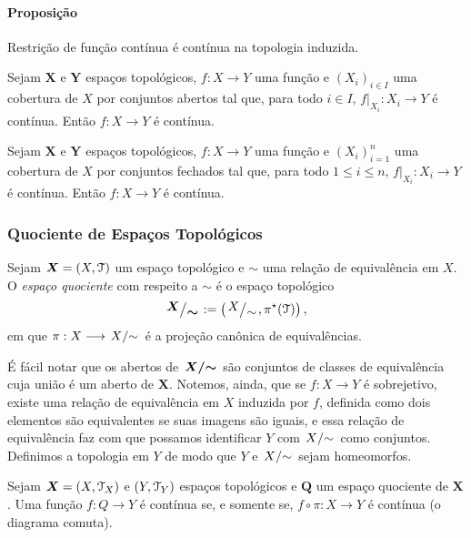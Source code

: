 \paragraph*{Proposição} Restrição de função contínua é contínua na topologia induzida.

\begin{prop}
Sejam $\bm X$ e $\bm Y$ espaços topológicos, $f: X \to Y$ uma função e $(X_i)_{i \in I}$ uma cobertura de $X$ por conjuntos abertos tal que, para todo $i \in I$, $f|_{X_i}: X_i \to Y$ é contínua. Então $f: X \to Y$ é contínua.
\end{prop}

\begin{prop}
Sejam $\bm X$ e $\bm Y$ espaços topológicos, $f: X \to Y$ uma função e $(X_i)_{i=1}^n$ uma cobertura de $X$ por conjuntos fechados tal que, para todo $1 \leq i \leq n$, $f|_{X_i}: X_i \to Y$ é contínua. Então $f: X \to Y$ é contínua.
\end{prop}

\subsubsection{Quociente de Espaços Topológicos}

\begin{defi}
Sejam $\bm X = (X,\mathcal{T})$ um espaço topológico e $\sim$ uma relação de equivalência em $X$. O \emph{espaço quociente} com respeito a $\sim$ é o espaço topológico
	\begin{equation*}
	\bm{\quo{X}{\sim}} := \left( \quo{X}{\sim}, \pi^\star(\topo) \right),
	\end{equation*}
em que $\pi: X \to \quo{X}{\sim}$ é a projeção canônica de equivalências.
\end{defi}

É fácil notar que os abertos de $\bm{\quo{X}{\sim}}$ são conjuntos de classes de equivalência cuja união é um aberto de $\bm X$. Notemos, ainda, que se $f: X \to Y$ é sobrejetivo, existe uma relação de equivalência em $X$ induzida por $f$, definida como dois elementos são equivalentes se suas imagens são iguais, e essa relação de equivalência faz com que possamos identificar $Y$ com $\quo{X}{\sim}$ como conjuntos. Definimos a topologia em $Y$ de modo que $Y$ e $\quo{X}{\sim}$ sejam homeomorfos.

\begin{prop}
Sejam $\bm X=(X,\mathcal{T}_X)$ e $(Y,\mathcal{T}_Y)$ espaços topológicos e $\bm Q$ um espaço quociente de $\bm X$. Uma função $f: Q \to Y$ é contínua se, e somente se, $f \circ \pi: X \to Y$ é contínua (o diagrama comuta).
\begin{figure}
\centering
{}
\end{figure}
\end{prop}


